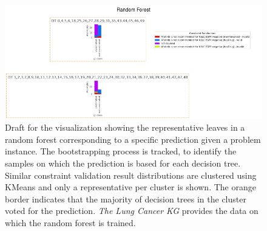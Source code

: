 \begin{figure}
    \centering
    \includegraphics[width=\textwidth]{images/random_forest_exp.png}
    \caption{Draft for the visualization showing the representative leaves in a random forest corresponding to a specific prediction given a problem instance. The bootstrapping process is tracked, to identify the samples on which the prediction is based for each decision tree. Similar constraint validation result distributions are clustered using KMeans and only a representative per cluster is shown. The orange border indicates that the majority of decision trees in the cluster voted for the prediction. \textit{The Lung Cancer KG} provides the data on which the random forest is trained.}
    \label{fig:random_forest_draft}
\end{figure}